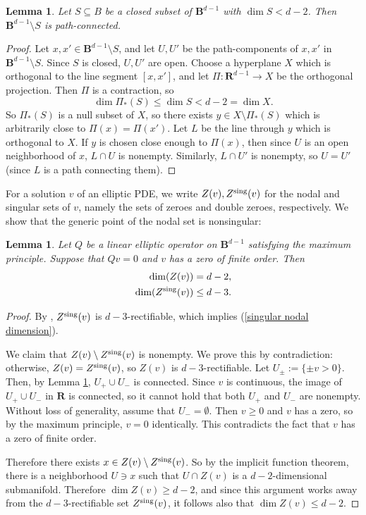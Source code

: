 \documentclass[reqno,11pt]{amsart}
\newcommand{\RR}{\mathbf{R}}
\newcommand{\Ball}{\mathbf{B}}
\newtheorem{lemma}[theorem]{Lemma}
\theoremstyle{definition}
\numberwithin{equation}{section}
\begin{document}
\begin{lemma}\label{open mfld complement}
Let $S \subseteq B$ be a closed subset of $\Ball^{d - 1}$ with $\dim S < d - 2$.
Then $\Ball^{d - 1} \setminus S$ is path-connected.
\end{lemma}
\begin{proof}
Let $x, x' \in \Ball^{d - 1} \setminus S$, and let $U, U'$ be the path-components of $x, x'$ in $\Ball^{d - 1} \setminus S$.
Since $S$ is closed, $U, U'$ are open.
Choose a hyperplane $X$ which is orthogonal to the line segment $[x, x']$, and let $\Pi: \RR^{d - 1} \to X$ be the orthogonal projection.
Then $\Pi$ is a contraction, so
$$\dim \Pi_*(S) \leq \dim S < d - 2 = \dim X.$$
So $\Pi_*(S)$ is a null subset of $X$, so there exists $y \in X \setminus \Pi_*(S)$ which is arbitrarily close to $\Pi(x) = \Pi(x')$.
Let $L$ be the line through $y$ which is orthogonal to $X$.
If $y$ is chosen close enough to $\Pi(x)$, then since $U$ is an open neighborhood of $x$, $L \cap U$ is nonempty.
Similarly, $L \cap U'$ is nonempty, so $U = U'$ (since $L$ is a path connecting them).
\end{proof}

For a solution $v$ of an elliptic PDE, we write $Z(v), Z^{\rm sing}(v)$ for the nodal and singular sets of $v$, namely the sets of zeroes and double zeroes, respectively.
We show that the generic point of the nodal set is nonsingular:

\begin{lemma}\label{nodal set is generically smooth}
Let $Q$ be a linear elliptic operator on $\Ball^{d - 1}$ satisfying the maximum principle.
Suppose that $Qv = 0$ and $v$ has a zero of finite order.
Then
\begin{align}
	\dim(Z(v)) &= d - 2, \label{nodal dimension}\\
	\dim(Z^{\rm sing}(v)) &\leq d - 3. \label{singular nodal dimension}
\end{align}
\end{lemma}
\begin{proof}
By \cite[Lemma 1.9]{Hardt89}, $Z^{\rm sing}(v)$ is $d - 3$-rectifiable, which implies (\ref{singular nodal dimension}).

We claim that $Z(v) \setminus Z^{\rm sing}(v)$ is nonempty.
We prove this by contradiction: otherwise, $Z(v) = Z^{\rm sing}(v)$, so $Z(v)$ is $d - 3$-rectifiable.
Let $U_\pm := \{\pm v > 0\}$.
Then, by Lemma \ref{open mfld complement}, $U_+ \cup U_-$ is connected.
Since $v$ is continuous, the image of $U_+ \cup U_-$ in $\RR$ is connected, so it cannot hold that both $U_+$ and $U_-$ are nonempty.
Without loss of generality, assume that $U_- = \emptyset$.
Then $v \geq 0$ and $v$ has a zero, so by the maximum principle, $v = 0$ identically.
This contradicts the fact that $v$ has a zero of finite order.

Therefore there exists $x \in Z(v) \setminus Z^{\rm sing}(v)$.
So by the implicit function theorem, there is a neighborhood $U \ni x$ such that $U \cap Z(v)$ is a $d - 2$-dimensional submanifold.
Therefore $\dim Z(v) \geq d - 2$, and since this argument works away from the $d - 3$-rectifiable set $Z^{\rm sing}(v)$, it follows also that $\dim Z(v) \leq d - 2$.
\end{proof}
\end{document}
